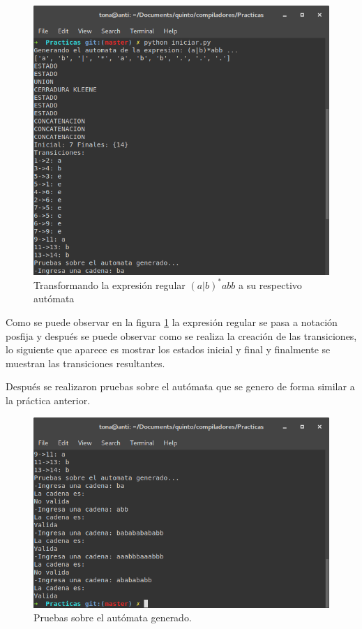 \documentclass[titlepage]{article}
\begin{document}
  \begin{figure}[H]
    \begin{center}
      \includegraphics[width=14cm]{generacion.png}
	\caption{Transformando la expresión regular $ (a|b)^{*}abb $ a su respectivo autómata}
	\label{fig:generacion}
    \end{center}
  \end{figure}
  
  Como se puede observar en la figura \ref{fig:generacion} la expresión regular se pasa a notación posfija y después se puede observar como se realiza 
  la creación de las transiciones, lo siguiente que aparece es mostrar los estados inicial y final y finalmente se muestran las transiciones resultantes. 
  
  Después se realizaron pruebas sobre el autómata que se genero de forma similar a la práctica anterior.
  
  \begin{figure}[H]
    \begin{center}
      \includegraphics[width=14cm]{pruebas.png}
	\caption{Pruebas sobre el autómata generado.}
	\label{fig:pruebas}
    \end{center}
  \end{figure}
  
\end{document}
